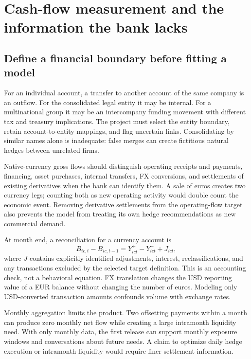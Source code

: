\chapter{Cash-flow measurement and the information the bank lacks}
\label{ch:observation}
\section{Define a financial boundary before fitting a model}
For an individual account, a transfer to another account of the same company is an outflow. For the consolidated legal entity it may be internal. For a multinational group it may be an intercompany funding movement with different tax and treasury implications. The project must select the entity boundary, retain account-to-entity mappings, and flag uncertain links. Consolidating by similar names alone is inadequate: false merges can create fictitious natural hedges between unrelated firms.

Native-currency gross flows should distinguish operating receipts and payments, financing, asset purchases, internal transfers, FX conversions, and settlements of existing derivatives when the bank can identify them. A sale of euros creates two currency legs; counting both as new operating activity would double count the economic event. Removing derivative settlements from the operating-flow target also prevents the model from treating its own hedge recommendations as new commercial demand.

At month end, a reconciliation for a currency account is
\begin{equation}
B_{ic,t}-B_{ic,t-1}=Y^+_{ict}-Y^-_{ict}+J_{ict},
\label{eq:accounting}
\end{equation}
where $J$ contains explicitly identified adjustments, interest, reclassifications, and any transactions excluded by the selected target definition. This is an accounting check, not a behavioral equation. FX translation changes the USD reporting value of a EUR balance without changing the number of euros. Modeling only USD-converted transaction amounts confounds volume with exchange rates.

Monthly aggregation limits the product. Two offsetting payments within a month can produce zero monthly net flow while creating a large intramonth liquidity need. With only monthly data, the first release can support monthly exposure windows and conversations about future needs. A claim to optimize daily hedge execution or intramonth liquidity would require finer settlement information.

